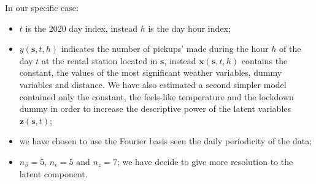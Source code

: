 In our specific case:
\begin{itemize}
	\item $t$ is the \num{2020} day index, instead $h$ is the day hour index; 
	\item $y(\boldsymbol{s}, t, h)$ indicates the number of pickups' made during the hour $h$ of the day $t$ at the rental station located in $\boldsymbol{s}$, instead $\boldsymbol{x}(\boldsymbol{s}, t, h)$ contains the constant, the values of the most significant weather variables, dummy variables and distance. We have also estimated a second simpler model contained only the constant, the feels-like temperature and the lockdown dummy in order to increase the descriptive power of the latent variables $\boldsymbol{z}(\boldsymbol{s}, t)$;
	\item we have chosen to use the Fourier basis seen the daily periodicity of the data;
	\item $n_\beta = 5$, $n_\epsilon = 5$ and $n_z = 7$; we have decide to give more resolution to the latent component.
\end{itemize}
